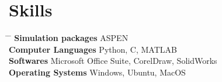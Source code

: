\documentclass[11pt]{article}
\begin{document}
\section{Skills}
	\vspace{-0.5cm}
	\parbox{\textwidth}{ 
		\begin{tabbing} 
			\hspace{6cm} \= \hspace{4cm} \= \kill 
			{\bf Simulation packages} \> ASPEN \\		
			{\bf Computer Languages} \> Python, C, MATLAB \\ 
			{\bf Softwares} \> Microsoft Office Suite, CorelDraw, SolidWorks\\
			{\bf Operating Systems} \> Windows, Ubuntu, MacOS
		\end{tabbing}
	}
\end{document}
